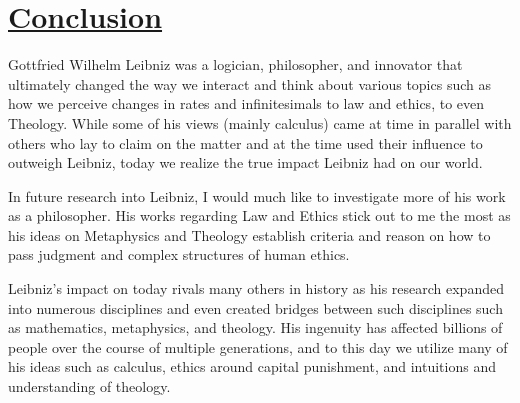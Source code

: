 \documentclass[12pt]{report}
\begin{document}
    \chapter*{\underline{Conclusion}}
Gottfried Wilhelm Leibniz was a logician, philosopher, and innovator that ultimately changed the way we interact and think about various topics such as how we perceive changes in rates and infinitesimals to law and ethics, to even Theology.
While some of his views (mainly calculus) came at time in parallel with others who lay to claim on the matter and at the time used their influence to outweigh Leibniz, today we realize the true impact Leibniz had on our world.\par
In future research into Leibniz, I would much like to investigate more of his work as a philosopher.
His works regarding Law and Ethics stick out to me the most as his ideas on Metaphysics and Theology establish criteria and reason on how to pass judgment and complex structures of human ethics. \par
Leibniz's impact on today rivals many others in history as his research expanded into numerous disciplines and even created bridges between such disciplines such as mathematics, metaphysics, and theology.
His ingenuity has affected billions of people over the course of multiple generations, and to this day we utilize many of his ideas such as calculus, ethics around capital punishment, and intuitions and understanding of theology.

    \newpage
    
\end{document}

